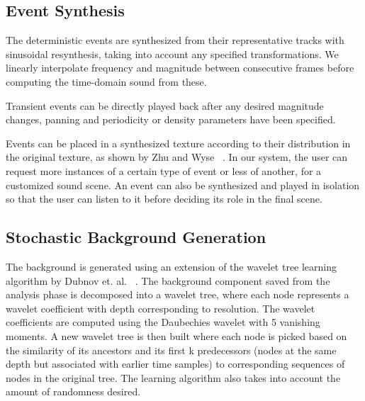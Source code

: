 \documentclass{acmsiggraph}               %
\begin{document}
\subsection{Event Synthesis}

The deterministic events are synthesized from their representative tracks with 
sinusoidal resynthesis, taking into account any specified transformations. 
We linearly interpolate frequency and magnitude 
between consecutive frames before computing the time-domain sound from 
these. 

Transient events can be directly played back after any 
desired magnitude changes, panning and periodicity or density parameters 
have been specified. 

Events can be placed in a synthesized texture according to their 
distribution in the original texture, as shown by Zhu and Wyse 
~. In our system, the user can request more instances of a 
certain type of event or less of another, for a customized sound scene. 
An event can also be 
synthesized and played in isolation so that the user can listen to it 
before deciding its role in the final scene.


\subsection{Stochastic Background Generation}

The background is generated using an extension of the wavelet tree 
learning algorithm by Dubnov et. al. ~. The background 
component saved from the analysis phase is 
decomposed into a wavelet tree, where each node represents a wavelet 
coefficient with depth corresponding to resolution.  The wavelet 
coefficients are computed using the Daubechies wavelet with 5 vanishing 
moments. A new wavelet tree is then built where each node is picked 
based on the similarity of its ancestors and its first k predecessors 
(nodes at the same depth but associated with earlier time samples) to 
corresponding sequences of nodes in the 
original tree. The learning algorithm also takes into account the amount of 
randomness desired.
\end{document}
